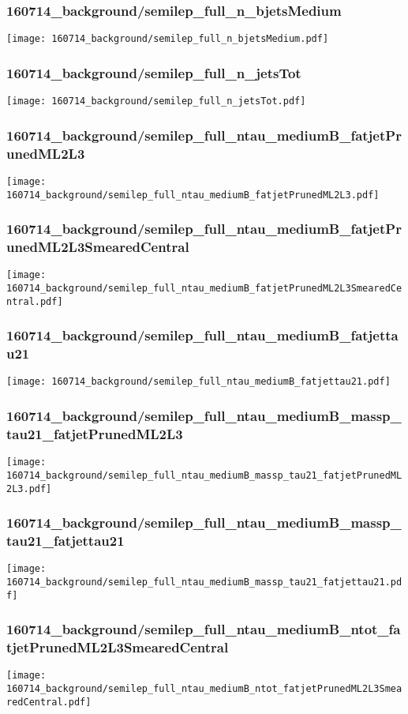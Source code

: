 \begin{frame}
   \frametitle{\small 160714\_background/semilep\_full\_n\_bjetsMedium}
   \centering
   \texttt{[image: 160714\_background/semilep\_full\_n\_bjetsMedium.pdf]}
\end{frame}

\begin{frame}
   \frametitle{\small 160714\_background/semilep\_full\_n\_jetsTot}
   \centering
   \texttt{[image: 160714\_background/semilep\_full\_n\_jetsTot.pdf]}
\end{frame}

\begin{frame}
   \frametitle{\small 160714\_background/semilep\_full\_ntau\_mediumB\_fatjetPrunedML2L3}
   \centering
   \texttt{[image: 160714\_background/semilep\_full\_ntau\_mediumB\_fatjetPrunedML2L3.pdf]}
\end{frame}

\begin{frame}
   \frametitle{\small 160714\_background/semilep\_full\_ntau\_mediumB\_fatjetPrunedML2L3SmearedCentral}
   \centering
   \texttt{[image: 160714\_background/semilep\_full\_ntau\_mediumB\_fatjetPrunedML2L3SmearedCentral.pdf]}
\end{frame}

\begin{frame}
   \frametitle{\small 160714\_background/semilep\_full\_ntau\_mediumB\_fatjettau21}
   \centering
   \texttt{[image: 160714\_background/semilep\_full\_ntau\_mediumB\_fatjettau21.pdf]}
\end{frame}

\begin{frame}
   \frametitle{\small 160714\_background/semilep\_full\_ntau\_mediumB\_massp\_tau21\_fatjetPrunedML2L3}
   \centering
   \texttt{[image: 160714\_background/semilep\_full\_ntau\_mediumB\_massp\_tau21\_fatjetPrunedML2L3.pdf]}
\end{frame}

\begin{frame}
   \frametitle{\small 160714\_background/semilep\_full\_ntau\_mediumB\_massp\_tau21\_fatjettau21}
   \centering
   \texttt{[image: 160714\_background/semilep\_full\_ntau\_mediumB\_massp\_tau21\_fatjettau21.pdf]}
\end{frame}

\begin{frame}
   \frametitle{\small 160714\_background/semilep\_full\_ntau\_mediumB\_ntot\_fatjetPrunedML2L3SmearedCentral}
   \centering
   \texttt{[image: 160714\_background/semilep\_full\_ntau\_mediumB\_ntot\_fatjetPrunedML2L3SmearedCentral.pdf]}
\end{frame}

